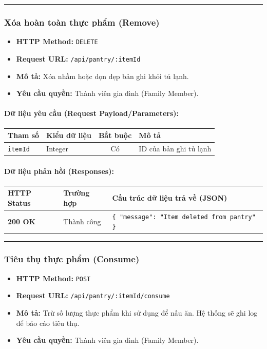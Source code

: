 \documentclass[12pt,a4paper]{article}
\begin{document}
\vskip 0.4cm
\noindent\rule{\textwidth}{0.3pt}
\vskip 0.4cm

\subsubsection{Xóa hoàn toàn thực phẩm (Remove)}
\begin{itemize}[leftmargin=*]
    \item \textbf{HTTP Method:} \texttt{DELETE}
    \item \textbf{Request URL:} \texttt{/api/pantry/:itemId}
    \item \textbf{Mô tả:} Xóa nhầm hoặc dọn dẹp bản ghi khỏi tủ lạnh.
    \item \textbf{Yêu cầu quyền:} Thành viên gia đình (Family Member).
\end{itemize}

\paragraph{Dữ liệu yêu cầu (Request Payload/Parameters):}
\begin{longtable}{|p{2.8cm}|p{2.2cm}|c|p{7.0cm}|}
\hline
\textbf{Tham số} & \textbf{Kiểu dữ liệu} & \textbf{Bắt buộc} & \textbf{Mô tả} \\ \hline
\endhead
\texttt{itemId} & Integer & Có & ID của bản ghi tủ lạnh \\ \hline
\end{longtable}

\paragraph{Dữ liệu phản hồi (Responses):}
\begin{longtable}{|p{2.8cm}|p{3.2cm}|p{8.0cm}|}
\hline
\textbf{HTTP Status} & \textbf{Trường hợp} & \textbf{Cấu trúc dữ liệu trả về (JSON)} \\ \hline
\endhead
\textbf{200 OK} & Thành công & \texttt{\{ "message": "Item deleted from pantry" \}} \\ \hline
\end{longtable}

\vskip 0.4cm
\noindent\rule{\textwidth}{0.3pt}
\vskip 0.4cm

\subsubsection{Tiêu thụ thực phẩm (Consume)}
\begin{itemize}[leftmargin=*]
    \item \textbf{HTTP Method:} \texttt{POST}
    \item \textbf{Request URL:} \texttt{/api/pantry/:itemId/consume}
    \item \textbf{Mô tả:} Trừ số lượng thực phẩm khi sử dụng để nấu ăn. Hệ thống sẽ ghi log để báo cáo tiêu thụ.
    \item \textbf{Yêu cầu quyền:} Thành viên gia đình (Family Member).
\end{itemize}
\end{document}

